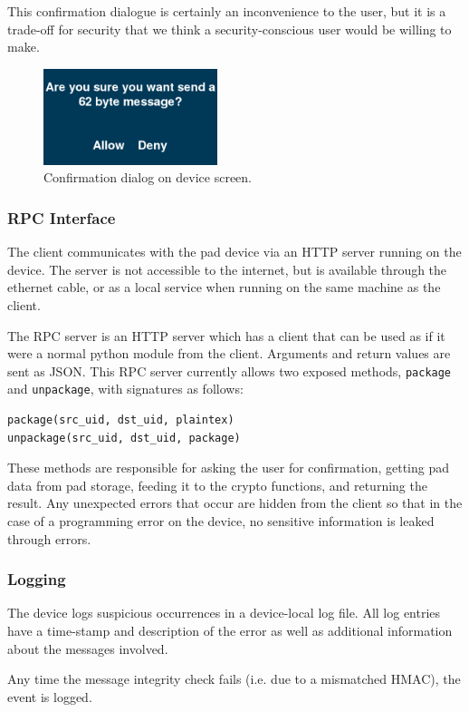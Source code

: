 \documentclass[twocolumn]{article}
\begin{document}
This confirmation dialogue is certainly an inconvenience to the user, but it is a trade-off for security that we think a security-conscious user would be willing to make.

\begin{figure}[htp]
\centering
\includegraphics[width=2in]{confirm}
\caption{Confirmation dialog on device screen.}
\label{fig:confirmation}
\end{figure}

\subsubsection{RPC Interface}
The client communicates with the pad device via an HTTP server running on the device. The server is not accessible to the internet, but is available through the ethernet cable, or as a local service when running on the same machine as the client.

The RPC server is an HTTP server which has a client that can be used as if it were a normal python module
from the client. Arguments and return values are sent as JSON.
This RPC server currently allows two exposed methods, \texttt{package} and \texttt{unpackage}, with signatures as follows:
\begin{lstlisting}
package(src_uid, dst_uid, plaintex)
unpackage(src_uid, dst_uid, package)
\end{lstlisting}
These methods are responsible for asking the user for confirmation, getting pad data from pad storage, feeding it to the crypto functions, and returning the result. Any unexpected errors that occur are hidden from the client so that in the case of a programming error on the device, no sensitive information is leaked through errors.

\subsubsection{Logging}
The device logs suspicious occurrences in a device-local log file.
All log entries have a time-stamp and description of the error as well as
additional information about the messages involved.

Any time the message integrity check fails (i.e. due to a mismatched HMAC), the event is logged.
\end{document}
